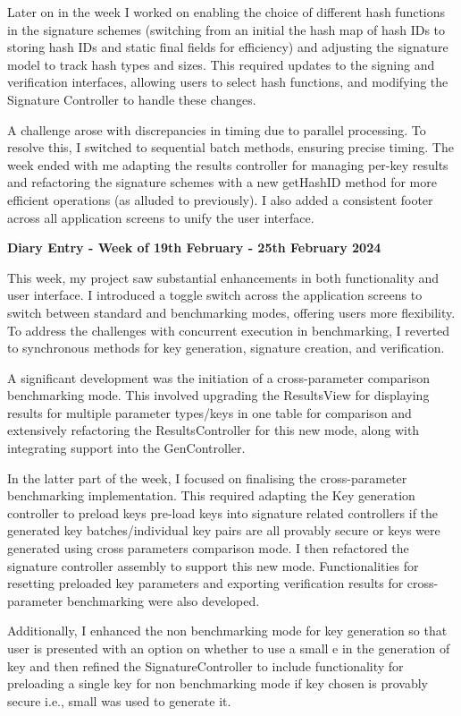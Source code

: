 \documentclass[]{final_report}
\theoremstyle{definition}
\begin{document}
Later on in the week I worked on enabling the choice of different hash functions in the signature
schemes (switching from an initial the hash map of hash IDs to storing hash IDs and static final
fields for efficiency) and adjusting the signature model to track hash types and sizes. This
required updates to the signing and verification interfaces, allowing users to select hash
functions, and modifying the Signature Controller to handle these changes.

A challenge arose with discrepancies in timing due to parallel processing. To resolve this, I
switched to sequential batch methods, ensuring precise timing. The week ended with me adapting the
results controller for managing per-key results and refactoring the signature schemes with a new
getHashID method for more efficient operations (as alluded to previously). I also added a consistent
footer across all application screens to unify the user interface.

\textbf{Diary Entry - Week of 19th February - 25th February 2024}

This week, my project saw substantial enhancements in both functionality and user interface. I
introduced a toggle switch across the application screens to switch between standard and
benchmarking modes, offering users more flexibility. To address the challenges with concurrent
execution in benchmarking, I reverted to synchronous methods for key generation, signature creation,
and verification.

A significant development was the initiation of a cross-parameter comparison benchmarking mode. This
involved upgrading the ResultsView for displaying results for multiple parameter types/keys in one
table for comparison and extensively refactoring the ResultsController for this new mode, along with
integrating support into the GenController.

In the latter part of the week, I focused on finalising the cross-parameter benchmarking
implementation. This required adapting the Key generation controller to preload keys pre-load keys
into signature related controllers if the generated key batches/individual key pairs are all
provably secure or keys were generated using cross parameters comparison mode. I then refactored the
signature controller assembly to support this new mode. Functionalities for resetting preloaded key
parameters and exporting verification results for cross-parameter benchmarking were also developed.

Additionally, I enhanced the non benchmarking mode for key generation so that user is presented with
an option on whether to use a small e in the generation of key and then refined the
SignatureController to include functionality for preloading a single key for non benchmarking mode
if key chosen is provably secure i.e., small was used to generate it.
\end{document}
